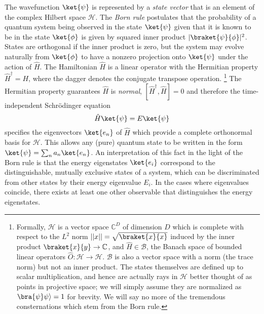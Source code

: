 	The wavefunction $\ket{\psi}$ is represented by a \emph{state vector} that is an element of the complex Hilbert space $\mathcal{H}$. The \emph{Born rule} postulates that the probability of a quantum system being observed in the state $\ket{\psi}$ given that it is known to be in the state $\ket{\phi}$ is given by squared inner product $|\braket{\psi}{\phi}|^2$. States are orthogonal if the inner product is zero, but the system may evolve naturally from $\ket{\phi}$ to have a nonzero projection onto $\ket{\psi}$ under the action of $\hat{H}$. The Hamiltonian $\hat{H}$ is a linear operator with the Hermitian property $\hat{H}^\dagger=H$, where the dagger denotes the conjugate transpose operation. \footnote{Formally, $\mathcal{H}$ is a vector space $\mathbb{C}^D$ of dimension $D$ which is complete with respect to the $L^2$ norm $||x||=\sqrt{\braket{x}{x}}$ induced by the inner product $\braket{x}{y}\rightarrow\mathbb{C}$, and $\hat{H}\in\mathcal{B}$, the Banach space of bounded linear operators $\hat{O}:\mathcal{H}\rightarrow\mathcal{H}$. $\mathcal{B}$ is also a vector space with a norm (the trace norm) but not an inner product. The states themselves are defined up to scalar multiplication, and hence are actually rays in $\mathcal{H}$ better thought of as points in projective space; we will simply assume they are normalized as $\bra{\psi}\psi\rangle=1$ for brevity. We will say no more of the tremendous consternations which stem from the Born rule.}	The Hermitian property guarantees $\hat{H}$ is \emph{normal}, $[\hat{H}^\dagger, \hat{H}]=0$ and therefore the time-independent Schr\"{o}dinger equation
	\begin{equation}
		\hat{H}\ket{\psi} = E\ket{\psi}
		\label{eqn:TISE}
	\end{equation}
	specifies the eigenvectors $\ket{e_n}$ of $\hat{H}$ which provide a complete orthonormal basis for $\mathcal{H}$. This allows any (pure) quantum state to be written in the form $\ket{\psi} = \sum_n a_n\ket{e_n}$. An interpretation of this fact in the light of the Born rule is that the energy eigenstates $\ket{e_i}$ correspond to the distinguishable, mutually exclusive states of a system, which can be discriminated from other states by their energy eigenvalue $E_i$. In the cases where eigenvalues coincide, there exists at least one other observable that distinguishes the energy eigenstates. 
	
